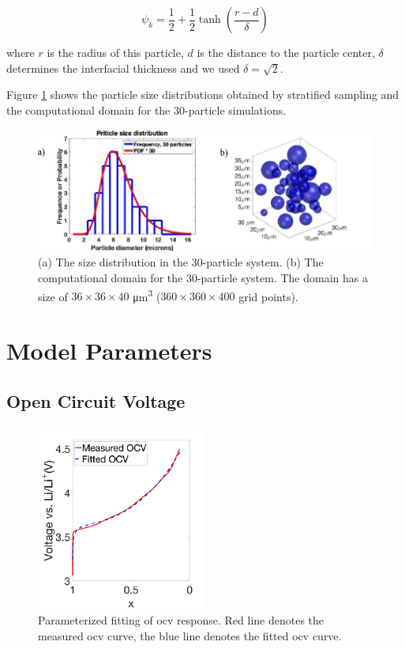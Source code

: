 \documentclass{article}
\begin{document}
\begin{equation}
  \psi_k=\frac{1}{2}+\frac{1}{2}\tanh\left(\frac{r-d}{\delta}\right)
  \label{eq:11}
\end{equation}

where $r$ is the radius of this particle, $d$ is the distance to the
particle center, $\delta$ determines the interfacial thickness and we
used $\delta = \sqrt{2}$.

Figure \ref{fig:30-particle-box} shows the particle size distributions
obtained by stratified sampling\cite{parsons2017} and the
computational domain for the 30-particle simulations.

\begin{figure}
  \includegraphics[width=\textwidth]{30-particle-simulation.pdf}
  \caption{(a) The size distribution in the 30-particle system. (b) The
    computational domain for the 30-particle system. The domain has a
    size of $36 \times 36 \times 40$ \si{\micro\meter\cubed} ($360
    \times 360 \times 400$ grid points).}
  \label{fig:30-particle-box}
\end{figure}

\section{Model Parameters}

\subsection{Open Circuit Voltage}

\begin{figure}
  \includegraphics[width=0.5\textwidth]{echem-fit.pdf}
  \caption{Parameterized fitting of \gls{ocv} response. Red line
    denotes the measured \gls{ocv} curve, the blue line denotes the
    fitted \gls{ocv} curve.}
  \label{fig:ocv-response}
\end{figure}
\end{document}
